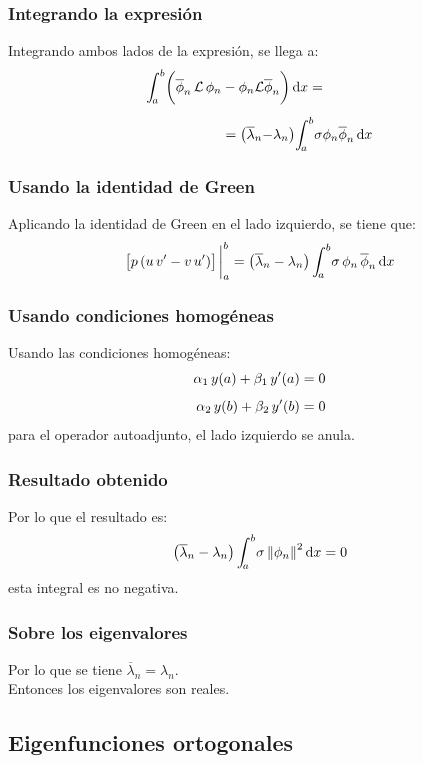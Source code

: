 \documentclass[12pt]{beamer}
\begin{document}
\begin{frame}
\frametitle{Integrando la expresión}
Integrando ambos lados de la expresión, se llega a:
\pause
\begin{align*}
\scaleint{5ex}_{\bs a}^{b} \bigg( \overline{\phi}_{n} \, \mathcal{L} \, \phi_{n} &- \phi_{n} \mathcal{L} \overline{\phi}_{n} \bigg) \dd{x} = \\[0.5em]
&=\big( \overline{\lambda}_{n} {-} \lambda_{n} \big) \scaleint{5ex}_{\bs a}^{b} \sigma \phi_{n} \overline{\phi}_{n} \dd{x}
\end{align*}
\end{frame}
\begin{frame}
\frametitle{Usando la identidad de Green}
Aplicando la identidad de Green en el lado izquierdo, se tiene que:
\pause
\begin{align*}
\big[ p \, (u \, \pderivada{v} - v \, \pderivada{u}) \big]\eval_{a}^{b} = \big( \overline{\lambda}_{n} - \lambda_{n} \big) \, \scaleint{5ex}_{\bs a}^{b} \sigma \, \phi_{n} \, \overline{\phi}_{n} \dd{x}
\end{align*}
\end{frame}
\begin{frame}
\frametitle{Usando condiciones homogéneas}
Usando las condiciones homogéneas:
\pause
\begin{align*}
\alpha_{1} \, y (a) + \beta_{1} \, {y}^{\prime} (a) &= 0 \\[0.5em]
\alpha_{2} \, y (b) + \beta_{2} \, {y}^{\prime} (b) &= 0
\end{align*}
para el operador autoadjunto, el lado izquierdo se anula.
\end{frame}
\begin{frame}
\frametitle{Resultado obtenido}
Por lo que el resultado es:
\pause
\begin{align*}
\big( \overline{\lambda}_{n} - \lambda_{n} \big) \, \scaleint{5ex}_{\bs a}^{b} \sigma \, \norm{\phi_{n}}^{2} \dd{x} = 0
\end{align*}
esta integral es no negativa.
\end{frame}
\begin{frame}
\frametitle{Sobre los eigenvalores}
Por lo que se tiene $\overline{\lambda}_{n} = \lambda_{n}$.
\\
\bigskip
\pause
 Entonces los eigenvalores son reales.
\end{frame}

\subsection{Eigenfunciones ortogonales}
\end{document}
